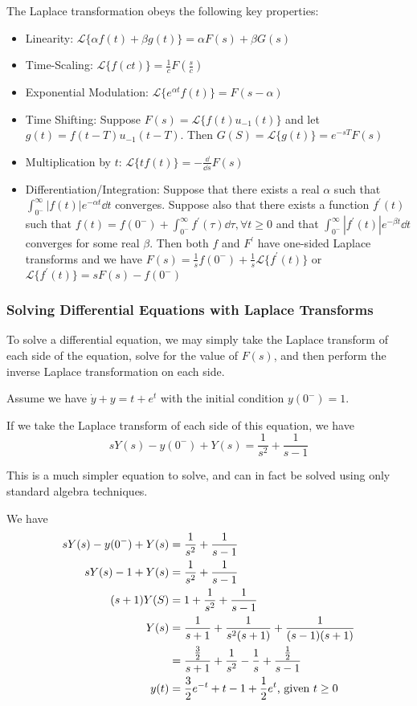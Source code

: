 \documentclass[12pt]{article}
\newcommand{\laplace}[1]{\ensuremath{\mathcal{L} \{#1\}}}
\begin{document}
The Laplace transformation obeys the following key properties:
\begin{itemize}
\item Linearity: $\laplace{ \alpha f(t) + \beta g(t)} = \alpha F(s) + \beta G(s)$
\item Time-Scaling: $\laplace{f(ct)} = \frac{1}{c}F(\frac{s}{c})$
\item Exponential Modulation: $\laplace{e^{\alpha t} f(t)} = F(s-\alpha)$
\item Time Shifting: Suppose $F(s) = \laplace{f(t) u_{-1}(t)}$ and let $g(t) = f(t - T)u_{-1}(t - T)$. Then $G(S) = \laplace{g(t)} = e^{-sT} F(s)$
\item Multiplication by $t$: $\laplace{tf(t)} = -\frac{\dd}{\dd s} F(s)$
\item Differentiation/Integration: Suppose that there exists a real $\alpha$ such that $\displaystyle\int_{0^-}^\infty |f(t)| e^{-\alpha t} \dd t$ converges. Suppose also that there exists a function $f^\prime(t)$ such that $f(t) = f(0^-) + \displaystyle\int_{0^-}^\infty f^\prime(\tau) \dd \tau, \forall t \geq 0$ and that $\displaystyle\int_{0^-}^\infty |f^\prime(t)| e^{-\beta t} \dd t$ converges for some real $\beta$. Then both $f$ and $F^\prime$ have one-sided Laplace transforms and we have $F(s) = \frac{1}{s}f(0^-) + \frac{1}{s} \laplace{f^\prime(t)}$ or $\laplace{f^\prime(t)} = sF(s) - f(0^-)$
\end{itemize}

\subsubsection{Solving Differential Equations with Laplace Transforms}
To solve a differential equation, we may simply take the Laplace transform of each side of the equation, solve for the value of $F(s)$, and then perform the inverse Laplace transformation on each side.

\begin{example}
Assume we have $\dot y + y = t + e^t$ with the initial condition $y(0^-) = 1$.

If we take the Laplace transform of each side of this equation, we have \[ sY(s) - y(0^-) + Y(s) = \frac{1}{s^2} + \frac{1}{s-1} \]

This is a much simpler equation to solve, and can in fact be solved using only standard algebra techniques.

We have
\begin{align*}
sY(s) - y(0^-) + Y(s) &= \frac{1}{s^2} + \frac{1}{s-1}\\
sY(s) - 1 + Y(s) &= \frac{1}{s^2} + \frac{1}{s-1}\\
(s+1)Y(S) &= 1 + \frac{1}{s^2} + \frac{1}{s-1}\\
Y(s) &= \frac{1}{s+1} + \frac{1}{s^2(s+1)} + \frac{1}{(s-1)(s+1)}\\
&= \frac{\frac{3}{2}}{s+1} + \frac{1}{s^2} - \frac{1}{s} + \frac{\frac{1}{2}}{s-1}\\
y(t) &= \frac{3}{2}e^{-t} + t - 1 + \frac{1}{2} e^t \text{, given }t \geq 0
\end{align*}
\end{example}
\end{document}
